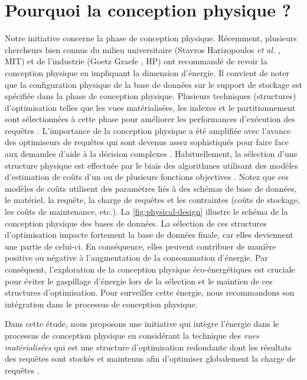 \section{Pourquoi la conception physique ?}\label{PourquoiConceptionPhysique}
Notre initiative concerne la phase de conception physique. Récemment, plusieurs chercheurs bien connus du milieu universitaire (Stavros Harizopoulos \textit{et al.} \cite{Harizopoulos09}, MIT) et de l'industrie (Goetz Graefe \cite{Graefe08}, HP) ont recommandé de revoir la conception physique en impliquant la dimension d'énergie. Il convient de noter que la configuration physique de la base de données sur le support de stockage est spécifiée dans la phase de conception physique. Plusieurs techniques (structures) d'optimisation telles que les vues matérialisées, les indexes et le partitionnement sont sélectionnées à cette phase pour améliorer les performances d'exécution des requêtes \cite{ElghandourAZZ13}. L'importance de la conception physique a été amplifiée avec l'avance des optimiseurs de requêtes qui sont devenus assez sophistiqués pour faire face aux demandes d'aide à la décision complexes \cite{ChaudhuriN07}. Habituellement, la sélection d'une structure physique est effectuée par le biais des algorithmes utilisant des modèles d'estimation de coûts d'un ou de plusieurs fonctions objectives \cite{Mami12}. Notez que ces modèles de coûts utilisent des paramètres liés à des schémas de base de données, le matériel, la requête, la charge de requêtes et les contraintes (coûts de stockage, les coûts de maintenance, etc.). La \ref{fig:physical-design} illustre le schéma de la conception physique des bases de données. La sélection de ces structures d'optimisation impacte fortement la base de données finale, car elles deviennent une partie de celui-ci. En conséquence, elles peuvent contribuer de manière positive ou négative à l'augmentation de la consommation d'énergie. Par conséquent, l'exploration de la conception physique éco-énergétiques est cruciale pour éviter le gaspillage d'énergie lors de la sélection et le maintien de ces structures d'optimisation. Pour surveiller cette énergie, nous recommandons son intégration dans le processus de conception physique.
 
Dans cette étude, nous proposons une initiative qui intègre l'énergie dans le processus de conception physique en considérant la technique des \textit{vues matérialisées} qui est une structure d'optimisation redondante dont les résultats des requêtes sont stockés et maintenus afin d'optimiser globalement la charge de requêtes \cite{Gupta99}.

